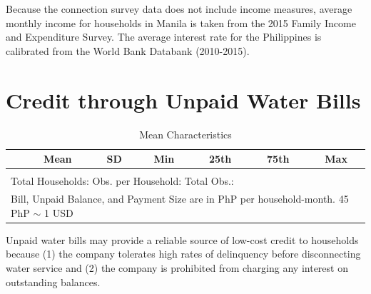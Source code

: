 \documentclass[12pt]{article}
\begin{document}
Because the connection survey data does not include income measures, average monthly income for households in Manila is taken from the 2015 Family Income and Expenditure Survey.  The average interest rate for the Philippines is calibrated from the World Bank Databank (2010-2015).

\section{Credit through Unpaid Water Bills}\label{section:descriptives}



\begin{table}[h!] %
\centering
\caption{Mean Characteristics}\label{table:descriptives_all}
\vspace{-2mm}
\begin{tabular}{l*{1}{cccccc}}
\toprule
 & Mean & SD & Min & 25th & 75th & Max  \\
\midrule

\bottomrule \\ [-.8em]
\multicolumn{7}{l}{Total Households:   Obs. per Household:  Total Obs.: } \\
\multicolumn{7}{l}{\scriptsize Bill, Unpaid Balance, and Payment Size are in PhP per household-month.  45 PhP $\sim$ 1 USD}
\end{tabular}
\end{table}

Unpaid water bills may provide a reliable source of low-cost credit to households because (1) the company tolerates high rates of delinquency before disconnecting water service and (2) the company is prohibited from charging any interest on outstanding balances. 
\end{document}
